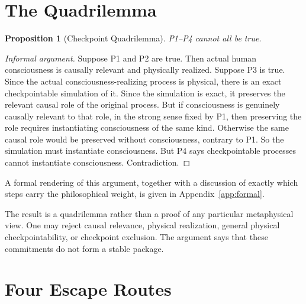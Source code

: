 \documentclass[11pt]{article}
\newtheorem{proposition}{Proposition}
\begin{document}
\section{The Quadrilemma}

\begin{proposition}[Checkpoint Quadrilemma]
  P1--P4 cannot all be true.
\end{proposition}

\begin{proof}[Informal argument]
  Suppose P1 and P2 are true. Then actual human consciousness is causally
  relevant and physically realized. Suppose P3 is true. Since the actual
  consciousness-realizing process is physical, there is an exact checkpointable
  simulation of it. Since the simulation is exact, it preserves the relevant
  causal role of the original process. But if consciousness is genuinely
  causally relevant to that role, in the strong sense fixed by P1, then
  preserving the role requires instantiating consciousness of the same kind.
  Otherwise the same causal role would be preserved without consciousness,
  contrary to P1. So the simulation must instantiate consciousness. But P4 says
  checkpointable processes cannot instantiate consciousness. Contradiction.
\end{proof}

\noindent
A formal rendering of this argument, together with a discussion of exactly
which steps carry the philosophical weight, is given in
Appendix~\ref{app:formal}.

The result is a quadrilemma rather than a proof of any particular metaphysical
view. One may reject causal relevance, physical realization, general physical
checkpointability, or checkpoint exclusion. The argument says that these
commitments do not form a stable package.

\section{Four Escape Routes}
\label{sec:escapes}
\end{document}
